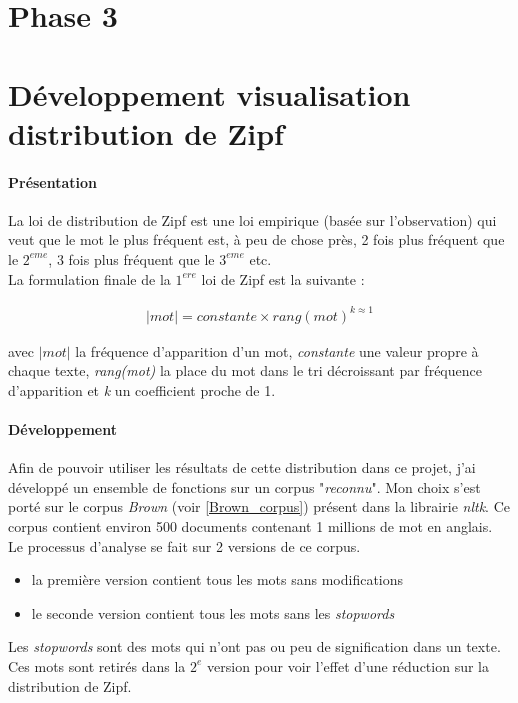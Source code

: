 \documentclass[a4paper,12pt]{article}
\begin{document}
\newpage
\section{Phase 3}



\newpage	
\appendix
\section{Développement visualisation distribution de Zipf}
	\label{sec:devZipf}
	\paragraph{Présentation}
		La loi de distribution de Zipf est une loi empirique (basée sur l'observation) qui veut que le mot le plus fréquent est, à peu de chose près, 2 fois plus fréquent que le $2^{eme}$, 3 fois plus fréquent que le $3^{eme}$ etc.\\
		
		La formulation finale de la $1^{ere}$ loi de Zipf est la suivante :
		
		\begin{align*}
				|mot| = constante \times rang(mot)^{k \approx 1}
		\end{align*}
		
		avec \emph{$|mot|$} la fréquence d'apparition d'un mot, \emph{constante} une valeur propre à chaque texte, \emph{rang(mot)} la place du mot dans le tri décroissant par fréquence d'apparition et \emph{k} un coefficient proche de 1. 
		
	\paragraph{Développement}
		Afin de pouvoir utiliser les résultats de cette distribution dans ce projet, j'ai développé un ensemble de fonctions sur un corpus "\emph{reconnu}". Mon choix s'est porté sur le corpus \emph{Brown} (voir \ref{Brown_corpus}) présent dans la librairie \emph{nltk}. Ce corpus contient environ 500 documents contenant 1 millions de mot en anglais.\\
		
		Le processus d'analyse se fait sur 2 versions de ce corpus.
		\begin{itemize}
			\item la première version contient tous les mots sans modifications
			\item le seconde version contient tous les mots sans les \emph{stopwords}
		\end{itemize}
		Les \emph{stopwords} sont des mots qui n'ont pas ou peu de signification dans un texte. Ces mots sont retirés dans la $2^e$ version pour voir l'effet d'une réduction sur la distribution de Zipf. \\
		
\end{document}
